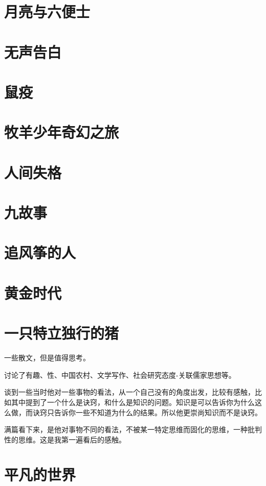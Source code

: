\documentclass[UTF8,a4paper,12pt]{ctexbook}
\begin{document}
	\section{月亮与六便士}
	
	\section{无声告白}
	
	\section{鼠疫}
	
	\section{牧羊少年奇幻之旅}
	
	\section{人间失格}
	
	\section{九故事}
	
	\section{追风筝的人}
	
	\section{黄金时代}
	
	\section{一只特立独行的猪}
		一些散文，但是值得思考。
		
		讨论了有趣、性、中国农村、文学写作、社会研究态度-关联儒家思想等。
		
		谈到一些当时他对一些事物的看法，从一个自己没有的角度出发，比较有感触，比如其中提到了一个什么是诀窍，和什么是知识的问题。知识是可以告诉你为什么这么做，而诀窍只告诉你一些不知道为什么的结果。所以他更崇尚知识而不是诀窍。
		
		满篇看下来，是他对事物不同的看法，不被某一特定思维而固化的思维，一种批判性的思维。这是我第一遍看后的感触。
		
	\section{平凡的世界}
		
\end{document}
